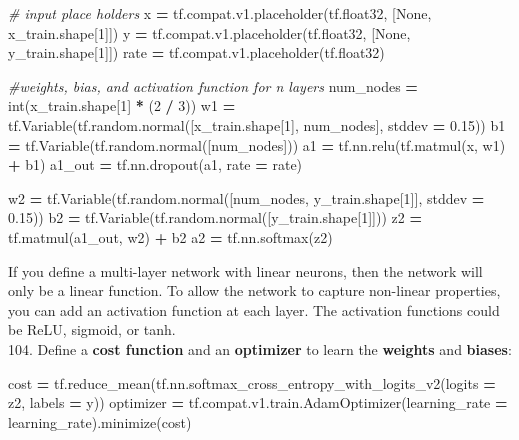 \documentclass[]{book}
\newenvironment{Shaded}{\begin{snugshade}}{\end{snugshade}}
\newcommand{\DecValTok}[1]{\textcolor[rgb]{0.00,0.00,0.81}{#1}}
\newcommand{\FloatTok}[1]{\textcolor[rgb]{0.00,0.00,0.81}{#1}}
\newcommand{\CommentTok}[1]{\textcolor[rgb]{0.56,0.35,0.01}{\textit{#1}}}
\newcommand{\VariableTok}[1]{\textcolor[rgb]{0.00,0.00,0.00}{#1}}
\newcommand{\OperatorTok}[1]{\textcolor[rgb]{0.81,0.36,0.00}{\textbf{#1}}}
\newcommand{\BuiltInTok}[1]{#1}
\newcommand{\NormalTok}[1]{#1}
\begin{document}
\begin{Shaded}
\begin{Highlighting}[]
\CommentTok{# input place holders}
\NormalTok{x }\OperatorTok{=}\NormalTok{ tf.compat.v1.placeholder(tf.float32, [}\VariableTok{None}\NormalTok{, x_train.shape[}\DecValTok{1}\NormalTok{]])}
\NormalTok{y }\OperatorTok{=}\NormalTok{ tf.compat.v1.placeholder(tf.float32, [}\VariableTok{None}\NormalTok{, y_train.shape[}\DecValTok{1}\NormalTok{]])}
\NormalTok{rate }\OperatorTok{=}\NormalTok{ tf.compat.v1.placeholder(tf.float32)}

\CommentTok{#weights, bias, and activation function for n layers}
\NormalTok{num_nodes }\OperatorTok{=} \BuiltInTok{int}\NormalTok{(x_train.shape[}\DecValTok{1}\NormalTok{] }\OperatorTok{*}\NormalTok{ (}\DecValTok{2} \OperatorTok{/} \DecValTok{3}\NormalTok{))}
\NormalTok{w1 }\OperatorTok{=}\NormalTok{ tf.Variable(tf.random.normal([x_train.shape[}\DecValTok{1}\NormalTok{], num_nodes], stddev }\OperatorTok{=} \FloatTok{0.15}\NormalTok{))}
\NormalTok{b1 }\OperatorTok{=}\NormalTok{ tf.Variable(tf.random.normal([num_nodes]))}
\NormalTok{a1 }\OperatorTok{=}\NormalTok{ tf.nn.relu(tf.matmul(x, w1) }\OperatorTok{+}\NormalTok{ b1)}
\NormalTok{a1_out }\OperatorTok{=}\NormalTok{ tf.nn.dropout(a1, rate }\OperatorTok{=}\NormalTok{ rate)}

\NormalTok{w2 }\OperatorTok{=}\NormalTok{ tf.Variable(tf.random.normal([num_nodes, y_train.shape[}\DecValTok{1}\NormalTok{]], stddev }\OperatorTok{=} \FloatTok{0.15}\NormalTok{))}
\NormalTok{b2 }\OperatorTok{=}\NormalTok{ tf.Variable(tf.random.normal([y_train.shape[}\DecValTok{1}\NormalTok{]]))}
\NormalTok{z2 }\OperatorTok{=}\NormalTok{ tf.matmul(a1_out, w2) }\OperatorTok{+}\NormalTok{ b2}
\NormalTok{a2 }\OperatorTok{=}\NormalTok{ tf.nn.softmax(z2)}
\end{Highlighting}
\end{Shaded}

If you define a multi-layer network with linear neurons, then the network will only be a linear function. To allow the network to capture non-linear properties, you can add an activation function at each layer. The activation functions could be ReLU, sigmoid, or tanh.\\
104. Define a \textbf{cost function} and an \textbf{optimizer} to learn the \textbf{weights} and \textbf{biases}:

\begin{Shaded}
\begin{Highlighting}[]
\NormalTok{cost }\OperatorTok{=}\NormalTok{ tf.reduce_mean(tf.nn.softmax_cross_entropy_with_logits_v2(logits }\OperatorTok{=}\NormalTok{ z2, labels }\OperatorTok{=}\NormalTok{ y))}
\NormalTok{optimizer }\OperatorTok{=}\NormalTok{ tf.compat.v1.train.AdamOptimizer(learning_rate }\OperatorTok{=}\NormalTok{ learning_rate).minimize(cost)}
\end{Highlighting}
\end{Shaded}
\end{document}
